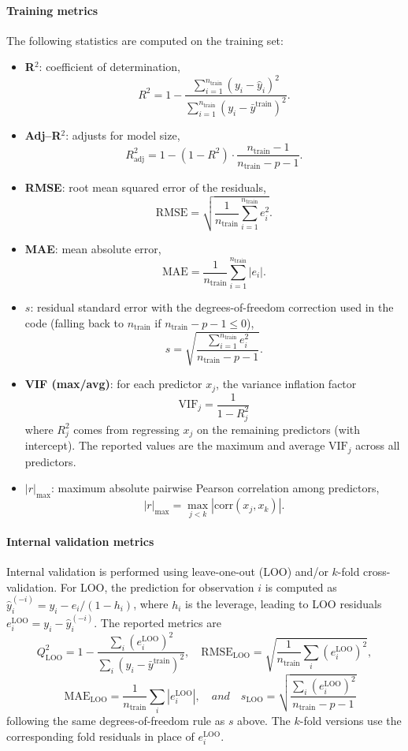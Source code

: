 \documentclass[11pt,a4paper]{article}
\begin{document}
\paragraph{Training metrics}
The following statistics are computed on the training set:
\begin{itemize}
  \item \textbf{R$^2$}: coefficient of determination,
  \[
  R^2 = 1 - \frac{\sum_{i=1}^{n_{\mathrm{train}}} (y_i - \hat{y}_i)^2}{\sum_{i=1}^{n_{\mathrm{train}}} (y_i - \bar{y}^{\mathrm{train}})^2}.
  \]
  \item \textbf{Adj--R$^2$}: adjusts for model size,
  \[
  R^2_{\mathrm{adj}} = 1 - (1 - R^2) \cdot \frac{n_{\mathrm{train}} - 1}{n_{\mathrm{train}} - p - 1}.
  \]
  \item \textbf{RMSE}: root mean squared error of the residuals,
  \[
  \mathrm{RMSE} = \sqrt{\frac{1}{n_{\mathrm{train}}} \sum_{i=1}^{n_{\mathrm{train}}} e_i^2}.
  \]
  \item \textbf{MAE}: mean absolute error,
  \[
  \mathrm{MAE} = \frac{1}{n_{\mathrm{train}}} \sum_{i=1}^{n_{\mathrm{train}}} |e_i|.
  \]
  \item \textbf{$s$}: residual standard error with the degrees-of-freedom correction used in the code (falling back to $n_{\mathrm{train}}$ if $n_{\mathrm{train}}-p-1 \leq 0$),
  \[
  s = \sqrt{\frac{\sum_{i=1}^{n_{\mathrm{train}}} e_i^2}{n_{\mathrm{train}} - p - 1}}.
  \]
  \item \textbf{VIF (max/avg)}: for each predictor $x_j$, the variance inflation factor
  \[
  \mathrm{VIF}_j = \frac{1}{1 - R_j^2}
  \]
  where $R_j^2$ comes from regressing $x_j$ on the remaining predictors (with intercept). The reported values are the maximum and average $\mathrm{VIF}_j$ across all predictors.
  \item \textbf{$|r|_{\max}$}: maximum absolute pairwise Pearson correlation among predictors,
  \[
  |r|_{\max} = \max_{j < k} \left|\mathrm{corr}(x_j, x_k)\right|.
  \]
\end{itemize}

\paragraph{Internal validation metrics}
Internal validation is performed using leave-one-out (LOO) and/or $k$-fold cross-validation. For LOO, the prediction for observation $i$ is computed as $\hat{y}_i^{(-i)} = y_i - e_i/(1 - h_i)$, where $h_i$ is the leverage, leading to LOO residuals $e_i^{\mathrm{LOO}} = y_i - \hat{y}_i^{(-i)}$. The reported metrics are
\[
Q^2_{\mathrm{LOO}} = 1 - \frac{\sum_i (e_i^{\mathrm{LOO}})^2}{\sum_i (y_i - \bar{y}^{\mathrm{train}})^2},\quad
\mathrm{RMSE}_{\mathrm{LOO}} = \sqrt{\frac{1}{n_{\mathrm{train}}}\sum_i (e_i^{\mathrm{LOO}})^2},\] 
\[\quad
\mathrm{MAE}_{\mathrm{LOO}} = \frac{1}{n_{\mathrm{train}}}\sum_i |e_i^{\mathrm{LOO}}|,\quad and \quad
 s_{\mathrm{LOO}} = \sqrt{\frac{\sum_i (e_i^{\mathrm{LOO}})^2}{n_{\mathrm{train}} - p - 1}}
\]
following the same degrees-of-freedom rule as $s$ above. The $k$-fold versions use the corresponding fold residuals in place of $e_i^{\mathrm{LOO}}$.
\end{document}
